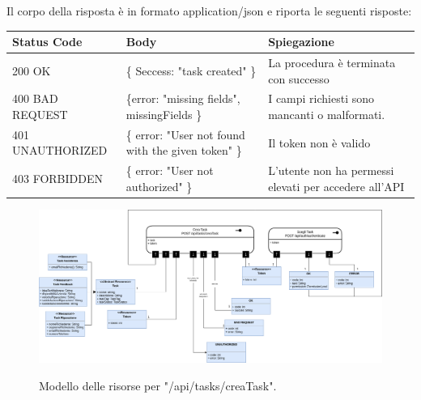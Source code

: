 \documentclass{report}
\begin{document}
Il corpo della risposta è in formato application/json e riporta le seguenti risposte:

\begin{center} %
	\centering
	\begin{tabular}{ |p{4cm}|p{4cm}|p{4cm}| }
		\hline
		\centering Status Code & \qquad\qquad\quad Body                             & \qquad\quad Spiegazione                               \\ %
		\hline
		200 OK                 & \{ Seccess: "task created" \}                      & La procedura è terminata con successo                 \\
		\hline
		400 BAD REQUEST        & \{error: "missing fields", missingFields \}        & I campi richiesti sono mancanti o malformati.         \\
		\hline
		401 UNAUTHORIZED       & \{ error: "User not found with the given token" \} & Il token non è valido                                 \\
		\hline
		403 FORBIDDEN          & \{ error: "User not authorized" \}                 & L'utente non ha permessi elevati per accedere all'API \\
		\hline
	\end{tabular}
\end{center}
\begin{figure}[H]
	\centering\includegraphics[width=1\textwidth]{images/model_crea_task.png}

	Modello delle risorse per "/api/tasks/creaTask".
\end{figure}
\end{document}
